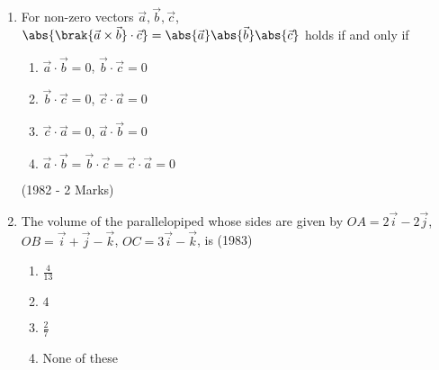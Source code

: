 \begin{enumerate}[label=\thesubsection.\arabic*.,ref=\thesubsection.\theenumi]
\item For non-zero vectors $\vec{a}, \vec{b}, \vec{c}$, $\abs{\brak{\vec{a}\times\vec{b}}\cdot\vec{c}} = \abs{\vec{a}}\abs{\vec{b}}\abs{\vec{c}}$ holds if and only if
  \begin{multicols}{2}
\begin{enumerate}
\item $\vec{a}\cdot\vec{b}=0$, $\vec{b}\cdot\vec{c}=0$
\item $\vec{b}\cdot\vec{c}=0$, $\vec{c}\cdot\vec{a}=0$
\item $\vec{c}\cdot\vec{a}=0$, $\vec{a}\cdot\vec{b}=0$
\item $\vec{a}\cdot\vec{b}= \vec{b}\cdot\vec{c}= \vec{c}\cdot\vec{a}=0$
\end{enumerate}
  \end{multicols}
\hfill (1982 - 2 Marks)

\item The volume of the parallelopiped whose sides are given by $OA =2\vec{i}-2\vec{j}$, $OB = \vec{i}+\vec{j}-\vec{k}$, $OC = 3\vec{i}-\vec{k}$, is 
\hfill (1983)
  \begin{multicols}{2}
\begin{enumerate}
\item $\frac{4}{13}$
\item $4$
\item $\frac{2}{7}$
\item None of these
\end{enumerate}
  \end{multicols}


\end{enumerate}
